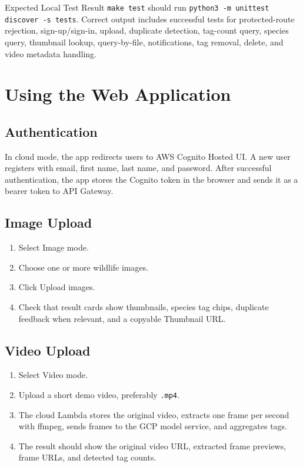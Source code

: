 \documentclass[12pt,a4paper]{article}
\begin{document}
\begin{manualbox}{Expected Local Test Result}
\texttt{make test} should run \texttt{python3 -m unittest discover -s tests}. Correct output includes successful tests for protected-route rejection, sign-up/sign-in, upload, duplicate detection, tag-count query, species query, thumbnail lookup, query-by-file, notifications, tag removal, delete, and video metadata handling.
\end{manualbox}

\section{Using the Web Application}
\subsection{Authentication}
In cloud mode, the app redirects users to AWS Cognito Hosted UI. A new user registers with email, first name, last name, and password. After successful authentication, the app stores the Cognito token in the browser and sends it as a bearer token to API Gateway.

\subsection{Image Upload}
\begin{enumerate}
  \item Select Image mode.
  \item Choose one or more wildlife images.
  \item Click Upload images.
  \item Check that result cards show thumbnails, species tag chips, duplicate feedback when relevant, and a copyable Thumbnail URL.
\end{enumerate}

\subsection{Video Upload}
\begin{enumerate}
  \item Select Video mode.
  \item Upload a short demo video, preferably \texttt{.mp4}.
  \item The cloud Lambda stores the original video, extracts one frame per second with ffmpeg, sends frames to the GCP model service, and aggregates tags.
  \item The result should show the original video URL, extracted frame previews, frame URLs, and detected tag counts.
\end{enumerate}
\end{document}
